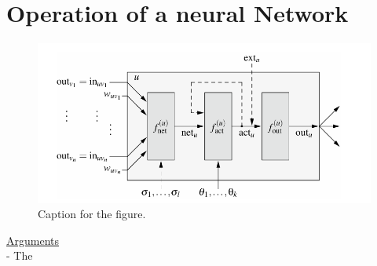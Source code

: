 \section{Operation of a neural Network}

\begin{figure}[htbp]
    \centering
    \includegraphics[width=\linewidth]{figs/rk_4.2.png}
    \caption{Caption for the figure.}
    \label{fig:mylabel}
  \end{figure}
  

\underline{Arguments} \\

- The 
